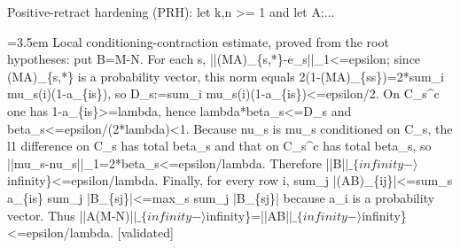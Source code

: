 \documentclass{article}
\newcommand{\step}[1]{\par\noindent\hangindent=3.5em\hangafter=1%
  \makebox[3.5em][l]{\textbf{#1.}}}
\newcommand{\steptag}[1]{\hfill{\small\textsf{[#1]}}}
\begin{document}
\begin{proofbox}{Positive-retract hardening (PRH): let k,n >= 1 and let A:...}
\step{1.2.3.2.1} Local conditioning-contraction estimate, proved from the root hypotheses: put B=M-N. For each s, ||(MA)\_\{s,*\}-e\_s||\_1<=epsilon; since (MA)\_\{s,*\} is a probability vector, this norm equals 2(1-(MA)\_\{ss\})=2*sum\_i mu\_s(i)(1-a\_\{is\}), so D\_s:=sum\_i mu\_s(i)(1-a\_\{is\})<=epsilon/2. On C\_s\textasciicircum{}c one has 1-a\_\{is\}>=lambda, hence lambda*beta\_s<=D\_s and beta\_s<=epsilon/(2*lambda)<1. Because nu\_s is mu\_s conditioned on C\_s, the l1 difference on C\_s has total beta\_s and that on C\_s\textasciicircum{}c has total beta\_s, so ||mu\_s-nu\_s||\_1=2*beta\_s<=epsilon/lambda. Therefore ||B|$|\_\{infinity-\rangle$infinity\}<=epsilon/lambda. Finally, for every row i, sum\_j |(AB)\_\{ij\}|<=sum\_s a\_\{is\} sum\_j |B\_\{sj\}|<=max\_s sum\_j |B\_\{sj\}| because a\_i is a probability vector. Thus ||A(M-N)|$|\_\{infinity-\rangle$infinity\}=||AB|$|\_\{infinity-\rangle$infinity\}<=epsilon/lambda. \steptag{validated} \\[4pt]
\end{proofbox}
\end{document}
